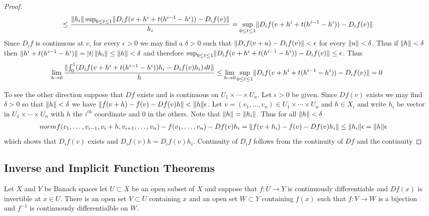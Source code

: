\begin{proof}
\begin{align*}
&\leq \frac{\lVert h_i \rVert \sup_{0 \leq t \leq 1} \lVert  D_i f(v+h^i + t(h^{i-1}-h^i)) - D_i f (v)  \rVert}{h_i} =  \sup_{0 \leq t \leq 1} \lVert  D_i f(v+h^i + t(h^{i-1}-h^i)) - D_i f (v)  \rVert\\
\end{align*}
Since $D_i f$ is continuous at $v$, for every $\epsilon > 0$ we may find a $\delta > 0$ such that $\lVert D_i f(v + u) - D_i f(v) \rVert < \epsilon$ for every $\lVert u \rVert < \delta$.  Thus if $\lVert h \rVert < \delta$ then $\lVert h^i + t(h^{i-1}-h^i) \rVert = \left \vert t \right \vert \lVert h_i \rVert \leq \lVert h \rVert < \delta$ and therefore $\sup_{0 \leq t \leq 1} \lVert  D_i f(v+h^i + t(h^{i-1}-h^i)) - D_i f (v)  \rVert\leq \epsilon$.  Thus 
\begin{align*}
\lim_{h \to 0} \frac{\lVert \int_0^1 (D_i f(v+h^i + t(h^{i-1}-h^i)) h_i - D_i f (v) h_i )\, dt \rVert}{h} \leq \lim_{h \to 0} \sup_{0 \leq t \leq 1} \lVert  D_i f(v+h^i + t(h^{i-1}-h^i)) - D_i f (v)  \rVert= 0
\end{align*}

To see the other direction suppose that $Df$ exists and is continuous on $U_1 \times \dotsb \times U_n$.  Let $\epsilon > 0$ be given.  Since $Df(v)$ exists we may find $\delta > 0$ so that $\lVert h \rVert < \delta$ we have $\lVert f(v+h) - f(v) - Df(v) h \rVert < \lVert h \rVert \epsilon$.   Let $v=(v_1, \dotsc, v_n) \in U_1 \times \dotsb \times U_n$ and $h \in X_i$ and write $h_i$ be vector in $U_1 \times \dotsb \times U_n$ with $h$ the $i^{th}$ coordinate and $0$ in the others.   Note that $\lVert h \rVert = \lVert h_i \rVert$.  Thus for all $\lVert h \rVert < \delta$
\begin{align*}
norm{f(v_1, \dotsc, v_{i-1}, v_i+h, v_{i+1}, \dotsc, v_n) - f(v_1, \dotsc, v_n) - Df(v) h_i} &= \lVert f(v + h_i) - f(v) - Df(v) h_i \rVert \leq \lVert h_i \rVert \epsilon = \lVert h \rVert \epsilon
\end{align*}
which shows that $D_i f(v)$ exists and $D_i f(v) h = D_i f(v) h_i$.  Continuity of $D_i f$ follows from the continuity of $Df$ and the continuity 
\end{proof}

\subsection{Inverse and Implicit Function Theorems}

\begin{thm}\label{InverseFunctionTheoremBanachSpaces}Let $X$ and $Y$ be Banach spaces let $U \subset X$ be an
  open subset of $X$ and suppose that $f : U \to Y$ is continuously
  differentiable and $Df(x)$ is invertible at $x \in U$.  There is an
  open set $V \subset U$ containing $x$ and an open set $W \subset Y$
  containing
  $f(x)$ such that $f : V \to W$ is a bijection and $f^{-1}$ is
  continuously differentialble on $W$.
\end{thm}

